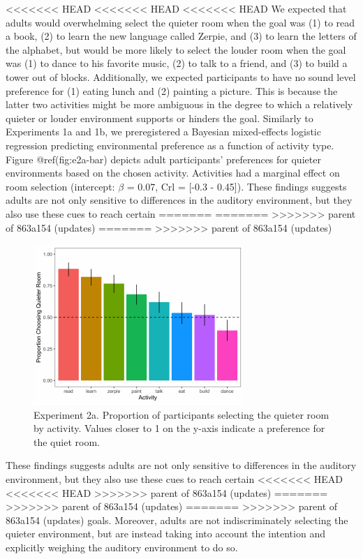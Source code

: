 \documentclass[10pt, letterpaper]{article}
\newenvironment{CodeChunk}{}{}
\begin{document}
<<<<<<< HEAD
<<<<<<< HEAD
<<<<<<< HEAD
We expected that adults would overwhelming select the quieter room when
the goal was (1) to read a book, (2) to learn the new language called
Zerpie, and (3) to learn the letters of the alphabet, but would be more
likely to select the louder room when the goal was (1) to dance to his
favorite music, (2) to talk to a friend, and (3) to build a tower out of
blocks. Additionally, we expected participants to have no sound level
preference for (1) eating lunch and (2) painting a picture. This is
because the latter two activities might be more ambiguous in the degree
to which a relatively quieter or louder environment supports or hinders
the goal. Similarly to Experiments 1a and 1b, we preregistered a
Bayesian mixed-effects logistic regression predicting environmental
preference as a function of activity type. Figure @ref(fig:e2a-bar)
depicts adult participants' preferences for quieter environments based
on the chosen activity. Activities had a marginal effect on room
selection (intercept: \(\beta\) = 0.07, Crl = {[}-0.3 - 0.45{]}). These
findings suggests adults are not only sensitive to differences in the
auditory environment, but they also use these cues to reach certain
=======
=======
>>>>>>> parent of 863a154 (updates)
=======
>>>>>>> parent of 863a154 (updates)
\begin{CodeChunk}
\begin{figure}[H]

{\centering \includegraphics{figs/image 5-1} 

}

\caption[Experiment 2a]{Experiment 2a. Proportion of participants selecting the quieter room by activity. Values closer to 1 on the y-axis indicate a preference for the quiet room.}\label{fig:image 5}
\end{figure}
\end{CodeChunk}

These findings suggests adults are not only sensitive to differences in
the auditory environment, but they also use these cues to reach certain
<<<<<<< HEAD
<<<<<<< HEAD
>>>>>>> parent of 863a154 (updates)
=======
>>>>>>> parent of 863a154 (updates)
=======
>>>>>>> parent of 863a154 (updates)
goals. Moreover, adults are not indiscriminately selecting the quieter
environment, but are instead taking into account the intention and
explicitly weighing the auditory environment to do so.
\end{document}
